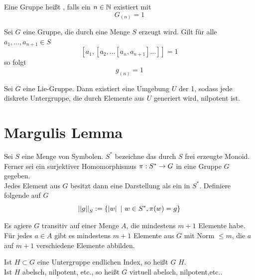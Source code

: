 \documentclass{book}
\begin{document}
\Def{}
Eine Gruppe heißt , falls ein $n \in \mathbb{N}$ existiert mit
\[ G_{(n)} = 1 \]

\Prop{}
Sei $G$ eine Gruppe, die durch eine Menge $S$ erzeugt wird. Gilt für alle $a_1,\ldots, a_{n+1} \in S$
\[ [a_1, [a_2,  \ldots [a_n, a_{n+1} ] \ldots ]] = 1 \]
so folgt
\[ g_{(n)} = 1 \]

\Lem{}
Sei $G$ eine Lie-Gruppe. Dann existiert eine Umgebung $U$ der 1, sodass jede diskrete Untergruppe, die durch Elemente aus $U$ generiert wird, nilpotent ist.

\section{Margulis Lemma}

\Def{}
Sei $S$ eine Menge von Symbolen. $S^*$ bezeichne das durch $S$ frei erzeugte Monoid. Ferner sei ein surjektiver Homomorphismus $\pi : S^* \overset{}{\rightarrow} G$ in eine Gruppe $G$ gegeben.\\
Jedes Element aus $G$ besitzt dann eine Darstellung als ein  in $S^*$. Definiere folgende  auf $G$
\[ \norm{g}_S := \set{\bet{w}}{w\in S^*, \pi(w) = g} \]

\Lem{}
Es agiere $G$ transitiv auf einer Menge $A$, die mindestens $m+1$ Elemente habe. Für jedes $a \in A$ gibt es mindestens $m+1$ Elemente aus $G$ mit Norm $\leq m$, die $a$ auf $m+1$ verschiedene Elemente abbilden.

\Def{}
Ist $H \subset G$ eine Untergruppe endlichen Index, so heißt $G$  $H$.\\
Ist $H$ abelsch, nilpotent, etc., so heißt $G$ virtuell abelsch, nilpotent,etc..
\end{document}

